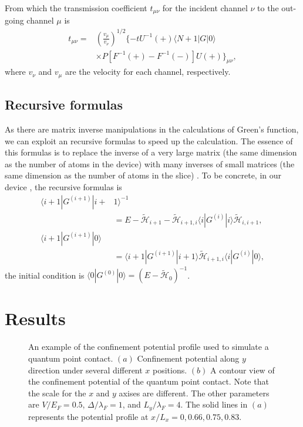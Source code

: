 \documentclass[journal]{IEEEtran}
\begin{document}
From which the transmission coefficient $t_{\mu\nu}$ for the incident channel $\nu$ to the out-going channel $\mu$ is
\begin{equation}
    \begin{split}
    t_{\mu\nu}=&(\frac{v_\mu}{v_\nu})^{1/2}\{-tU^{-1}(+)\langle N+1|G|0\rangle \\
    &\times P[F^{-1}(+)-F^{-1}(-)]U(+)\}_{\mu\nu},
\end{split}
    \label{}
\end{equation}
where $v_\nu$ and $v_\mu$ are the velocity for each channel, respectively.

\subsection{Recursive formulas}
As there are matrix inverse manipulations in the calculations of Green's function, we can exploit an recursive formulas
to speed up the calculation. The essence of this formulas is to replace the inverse of a very large matrix (the same
dimension as the number of atoms in the device) with many inverses of small matrices (the same dimension as the number
of atoms in the slice) \cite{A:1990}. To be concrete, in our device , the recursive formulas is
\begin{equation}
    \begin{split}
        \langle i+1|G^{(i+1)}|i+&1\rangle^{-1} \\
        &=E-\tilde{\mathcal{H}}_{i+1}-\tilde{\mathcal{H}}_{i+1,i}\langle i|G^{(i)}|i\rangle\tilde{\mathcal{H}}_{i,i+1},
        \\
        \langle i+1|G^{(i+1)}|0\rangle& \\
        &=\langle i+1|G^{(i+1)}|i+1\rangle\tilde{\mathcal{H}}_{i+1,i}\langle i|G^{(i)}|0\rangle,
    \end{split}
    \label{}
\end{equation}
the initial condition is $\langle0|G^{(0)}|0\rangle=(E-\tilde{\mathcal{H}}_0)^{-1}$.

\section{Results}\label{Results}

\begin{figure}
    \centering
    \caption{An example of the confinement potential profile used to simulate a quantum point contact. $(a)$ Confinement
    potential along $y$ direction under several different $x$ positions. $(b)$ A contour view of the confinement
potential of the quantum point contact. Note that the scale for the $x$ and $y$ axises are different. The other
parameters are $V/E_F=0.5$, $\Delta/\lambda_F=1$, and $L_y/\lambda_F=4$. The solid lines in $(a)$ represents the
potential profile at $x/L_x=0, 0.66, 0.75, 0.83$.}
    \label{fig1}
\end{figure}
\end{document}
